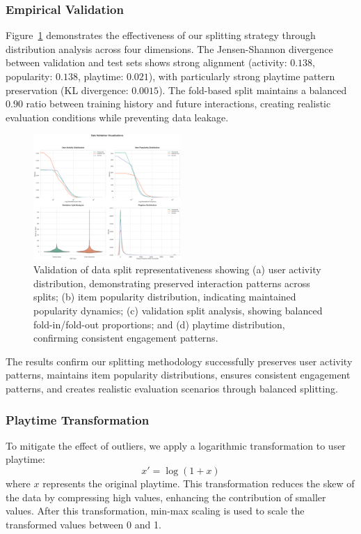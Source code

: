 \documentclass[conference,compsoc]{IEEEtran}
\begin{document}
\subsubsection{Empirical Validation}
Figure~\ref{fig:split_validation} demonstrates the effectiveness of our splitting strategy through distribution analysis across four dimensions. The Jensen-Shannon divergence between validation and test sets shows strong alignment (activity: $0.138$, popularity: $0.138$, playtime: $0.021$), with particularly strong playtime pattern preservation (KL divergence: $0.0015$). The fold-based split maintains a balanced $0.90$ ratio between training history and future interactions, creating realistic evaluation conditions while preventing data leakage.
\begin{figure}[h]
\centering
\includegraphics[width=0.5\textwidth]{images/split_validation.png}
\caption{Validation of data split representativeness showing (a) user activity distribution, demonstrating preserved interaction patterns across splits; (b) item popularity distribution, indicating maintained popularity dynamics; (c) validation split analysis, showing balanced fold-in/fold-out proportions; and (d) playtime distribution, confirming consistent engagement patterns.}
\label{fig:split_validation}
\end{figure}
The results confirm our splitting methodology successfully preserves user activity patterns, maintains item popularity distributions, ensures consistent engagement patterns, and creates realistic evaluation scenarios through balanced splitting.

\subsubsection{Playtime Transformation}
To mitigate the effect of outliers, we apply a logarithmic transformation to user playtime:
    \begin{equation}
        x' = \log(1 + x)
    \end{equation}
where $x$ represents the original playtime. This transformation reduces the skew of the data by compressing high values, enhancing the contribution of smaller values. After this transformation, min-max scaling is used to scale the transformed values between 0 and 1.
\end{document}
